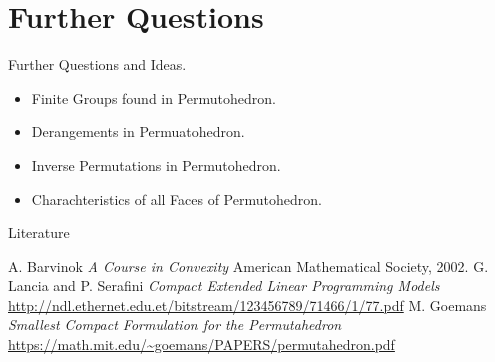 \documentclass{beamer}
\theoremstyle{plain}
\theoremstyle{definition}
\begin{document}
\section{Further Questions}
\begin{frame}{Further Questions and Ideas.}
    \begin{itemize}
        \item[1] Finite Groups found in Permutohedron.
        \item[2] Derangements in Permuatohedron.
        \item[3] Inverse Permutations in Permutohedron. 
        \item[4] Charachteristics of all Faces of Permutohedron.
    \end{itemize}
\end{frame}
\begin{frame}{Literature}
    
\begin{thebibliography}{3}
A. Barvinok \emph{A Course in Convexity} American Mathematical Society, 2002. 
G. Lancia and P. Serafini \emph{Compact Extended Linear
Programming Models} \url{http://ndl.ethernet.edu.et/bitstream/123456789/71466/1/77.pdf}
M. Goemans \emph{Smallest Compact Formulation for the Permutahedron} \url{https://math.mit.edu/~goemans/PAPERS/permutahedron.pdf}
\end{thebibliography}
\end{frame}
\end{document}
